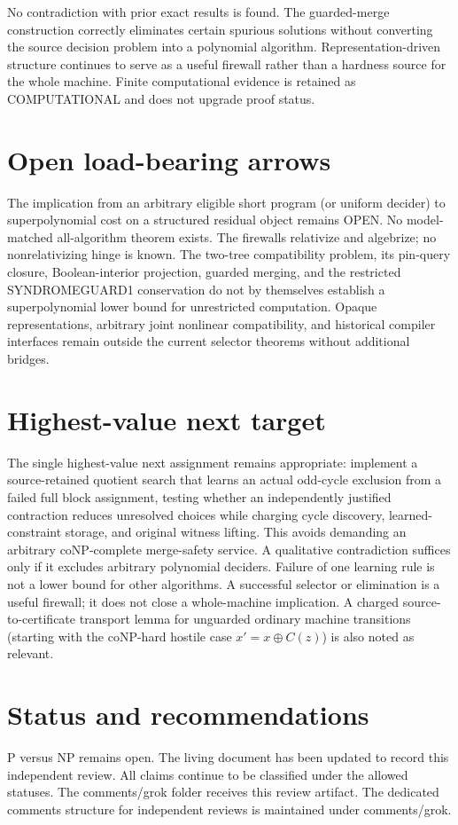 \documentclass[11pt]{article}
\begin{document}
No contradiction with prior exact results is found. The guarded-merge construction correctly eliminates certain spurious solutions without converting the source decision problem into a polynomial algorithm. Representation-driven structure continues to serve as a useful firewall rather than a hardness source for the whole machine. Finite computational evidence is retained as COMPUTATIONAL and does not upgrade proof status.

\section{Open load-bearing arrows}
The implication from an arbitrary eligible short program (or uniform decider) to superpolynomial cost on a structured residual object remains OPEN. No model-matched all-algorithm theorem exists. The firewalls relativize and algebrize; no nonrelativizing hinge is known. The two-tree compatibility problem, its pin-query closure, Boolean-interior projection, guarded merging, and the restricted SYNDROMEGUARD1 conservation do not by themselves establish a superpolynomial lower bound for unrestricted computation. Opaque representations, arbitrary joint nonlinear compatibility, and historical compiler interfaces remain outside the current selector theorems without additional bridges.

\section{Highest-value next target}
The single highest-value next assignment remains appropriate: implement a source-retained quotient search that learns an actual odd-cycle exclusion from a failed full block assignment, testing whether an independently justified contraction reduces unresolved choices while charging cycle discovery, learned-constraint storage, and original witness lifting. This avoids demanding an arbitrary coNP-complete merge-safety service. A qualitative contradiction suffices only if it excludes arbitrary polynomial deciders. Failure of one learning rule is not a lower bound for other algorithms. A successful selector or elimination is a useful firewall; it does not close a whole-machine implication. A charged source-to-certificate transport lemma for unguarded ordinary machine transitions (starting with the coNP-hard hostile case $x'=x\oplus C(z)$) is also noted as relevant.

\section{Status and recommendations}
P versus NP remains open. The living document has been updated to record this independent review. All claims continue to be classified under the allowed statuses. The comments/grok folder receives this review artifact. The dedicated comments structure for independent reviews is maintained under comments/grok.

\end{document}
